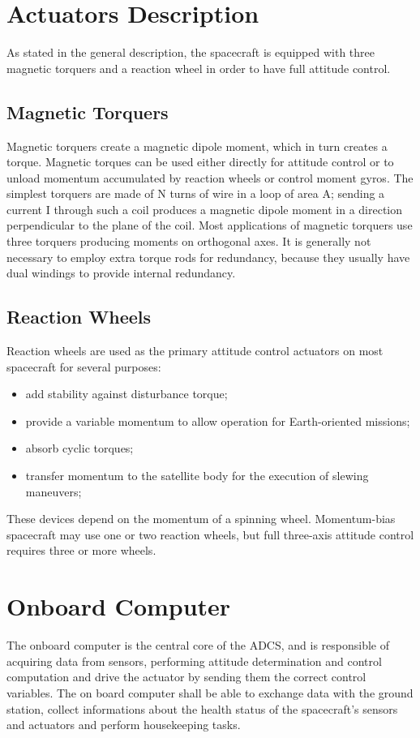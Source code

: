 \documentclass[11pt,a4paper]{report}
\begin{document}
\section{Actuators Description}
As stated in the general description, the spacecraft is equipped with three magnetic torquers and a reaction wheel in order to have full attitude control.
\subsection{Magnetic Torquers}
Magnetic torquers create a magnetic dipole moment, which in turn creates a torque.
Magnetic torques can be used either directly for attitude control or to unload momentum accumulated by reaction wheels or control moment gyros. The simplest torquers are made of N turns of wire in a loop of area A; sending a current
I through such a coil produces a magnetic dipole moment in a direction perpendicular to the plane of the coil. 
Most applications of magnetic torquers use three torquers producing moments on orthogonal axes. It is generally not necessary to employ extra torque rods for redundancy, because they usually have dual windings to provide internal
redundancy. 

\subsection{Reaction Wheels}
Reaction wheels are used as the primary attitude control actuators on most spacecraft for several purposes: 

\begin{itemize}
 \item add stability against disturbance torque;
 \item provide a variable momentum to allow operation for Earth-oriented missions;
 \item absorb cyclic torques;
 \item transfer momentum to the satellite body for the execution of slewing maneuvers;
\end{itemize}

These devices depend on the momentum of a spinning wheel.
Momentum-bias spacecraft may use one or two reaction wheels, but full three-axis attitude control requires three or more wheels.

\section{Onboard Computer}
The onboard computer is the central core of the ADCS, and is responsible of acquiring data from sensors, performing attitude determination and control computation and drive the actuator by sending them the correct control variables.
The on board computer shall be able to exchange data with the ground station, collect informations about the health status of the spacecraft's sensors and actuators and perform housekeeping tasks.
\end{document}
